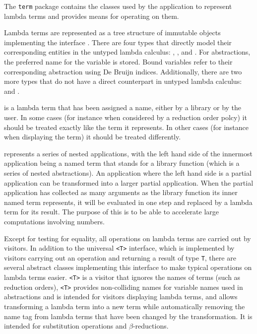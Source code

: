 The \texttt{term} package contains the classes used by the application to
represent lambda terms and provides means for operating on them.

Lambda terms are represented as a tree structure of immutable objects
implementing the interface \texttt{}. There are four types that
directly model their corresponding entities in the untyped lambda calculus:
\texttt{}, \texttt{}, \texttt{} and
\texttt{}. For abstractions, the preferred name for the variable is stored.
Bound variables refer to their corresponding abstraction using De Bruijn indices.
Additionally, there are two more types that do not have
a direct counterpart in untyped lambda calculus: \texttt{} and
\texttt{}.

\texttt{} is a lambda term that has been assigned a name, either by a
library or by the user. In some cases (for instance when considered by a
reduction order polcy) it should be treated exactly like the term it
represents. In other cases (for instance when displaying the term) it should be
treated differently.

\texttt{} represents a series of nested applications, with
the left hand side of the innermost application being a named term that stands
for a library function (which is a series of nested abstractions). An
application where the left hand side is a partial application can be
transformed into a larger partial application. When the partial application
has collected as many arguments as the library function its inner named
term represents, it will be evaluated in one step and replaced by a lambda
term for its result. The purpose of this is to be able to accelerate large
computations involving numbers.

Except for testing for equality, all operations on lambda terms are carried out
by visitors. In addition to the universal \texttt{<T>} interface, which
is implemented by visitors carrying out an operation and returning a result of type
\texttt{T}, there are several abstract classes implementing this interface to make
typical operations on lambda terms easier. \texttt{<T>} is a
visitor that ignores the names of terms (such as reduction orders),
\texttt{<T>} provides non-colliding names for variable names
used in abstractions and is intended for visitors displaying lambda terms, and
\texttt{} allows transforming a lambda term into a new term while
automatically removing the name tag from lambda terms that have been changed by
the transformation. It is intended for substitution operations and $\beta$-reductions.

